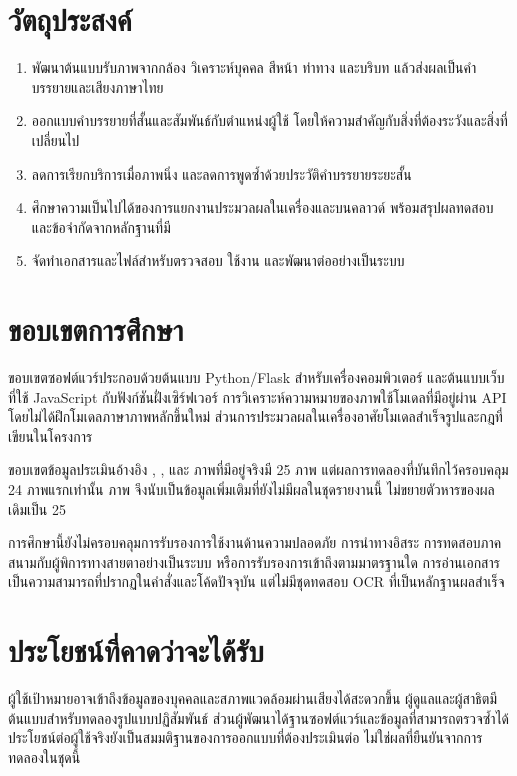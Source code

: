 \section{วัตถุประสงค์}
\begin{enumerate}
\item พัฒนาต้นแบบรับภาพจากกล้อง วิเคราะห์บุคคล สีหน้า ท่าทาง และบริบท แล้วส่งผลเป็นคำบรรยายและเสียงภาษาไทย
\item ออกแบบคำบรรยายที่สั้นและสัมพันธ์กับตำแหน่งผู้ใช้ โดยให้ความสำคัญกับสิ่งที่ต้องระวังและสิ่งที่เปลี่ยนไป
\item ลดการเรียกบริการเมื่อภาพนิ่ง และลดการพูดซ้ำด้วยประวัติคำบรรยายระยะสั้น
\item ศึกษาความเป็นไปได้ของการแยกงานประมวลผลในเครื่องและบนคลาวด์ พร้อมสรุปผลทดสอบและข้อจำกัดจากหลักฐานที่มี
\item จัดทำเอกสารและไฟล์สำหรับตรวจสอบ ใช้งาน และพัฒนาต่ออย่างเป็นระบบ
\end{enumerate}

\section{ขอบเขตการศึกษา}
ขอบเขตซอฟต์แวร์ประกอบด้วยต้นแบบ Python/Flask สำหรับเครื่องคอมพิวเตอร์ และต้นแบบเว็บที่ใช้ JavaScript กับฟังก์ชันฝั่งเซิร์ฟเวอร์ การวิเคราะห์ความหมายของภาพใช้โมเดลที่มีอยู่ผ่าน API โดยไม่ได้ฝึกโมเดลภาษาภาพหลักขึ้นใหม่ ส่วนการประมวลผลในเครื่องอาศัยโมเดลสำเร็จรูปและกฎที่เขียนในโครงการ

ขอบเขตข้อมูลประเมินอ้างอิง , ,  และ  ภาพที่มีอยู่จริงมี 25 ภาพ แต่ผลการทดลองที่บันทึกไว้ครอบคลุม 24 ภาพแรกเท่านั้น ภาพ  จึงนับเป็นข้อมูลเพิ่มเติมที่ยังไม่มีผลในชุดรายงานนี้ ไม่ขยายตัวหารของผลเดิมเป็น 25

การศึกษานี้ยังไม่ครอบคลุมการรับรองการใช้งานด้านความปลอดภัย การนำทางอิสระ การทดสอบภาคสนามกับผู้พิการทางสายตาอย่างเป็นระบบ หรือการรับรองการเข้าถึงตามมาตรฐานใด การอ่านเอกสารเป็นความสามารถที่ปรากฏในคำสั่งและโค้ดปัจจุบัน แต่ไม่มีชุดทดสอบ OCR ที่เป็นหลักฐานผลสำเร็จ

\section{ประโยชน์ที่คาดว่าจะได้รับ}
ผู้ใช้เป้าหมายอาจเข้าถึงข้อมูลของบุคคลและสภาพแวดล้อมผ่านเสียงได้สะดวกขึ้น ผู้ดูแลและผู้สาธิตมีต้นแบบสำหรับทดลองรูปแบบปฏิสัมพันธ์ ส่วนผู้พัฒนาได้ฐานซอฟต์แวร์และข้อมูลที่สามารถตรวจซ้ำได้ ประโยชน์ต่อผู้ใช้จริงยังเป็นสมมติฐานของการออกแบบที่ต้องประเมินต่อ ไม่ใช่ผลที่ยืนยันจากการทดลองในชุดนี้

